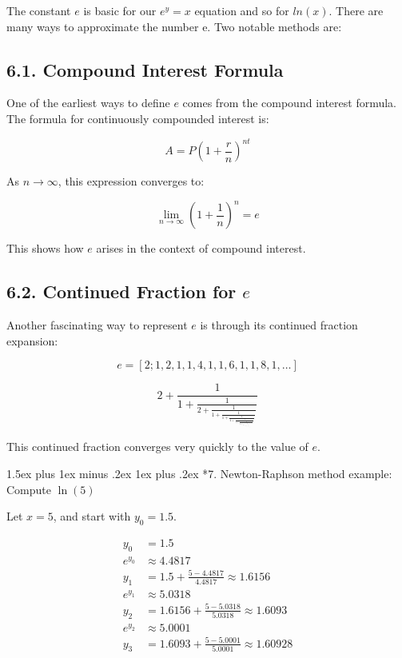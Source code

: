 \documentclass[10pt,twocolumn]{article}
\makeatletter
\renewcommand\section{%
  \@startsection{section}{1}{0pt}%
  {1.5ex plus 1ex minus .2ex}%
  {1ex plus .2ex}%
  {\normalfont\normalsize\bfseries}} %
\makeatother
\begin{document}
The constant \( e \) is basic for our \( e^y = x \) equation and so for \( ln(x) \). There are many ways to approximate the number e. Two notable methods are:

\subsection*{6.1. Compound Interest Formula}

One of the earliest ways to define \( e \) comes from the compound interest formula. The formula for continuously compounded interest is:

\[
A = P \left( 1 + \frac{r}{n} \right)^{nt}
\]

As \( n \to \infty \), this expression converges to:

\[
\lim_{n \to \infty} \left( 1 + \frac{1}{n} \right)^n = e
\]

This shows how \( e \) arises in the context of compound interest.

\subsection*{6.2. Continued Fraction for \( e \)}

Another fascinating way to represent \( e \) is through its continued fraction expansion:

\[
e = [2; 1, 2, 1, 1, 4, 1, 1, 6, 1, 1, 8, 1, \dots]
\]

\begin{equation}
2 + {\displaystyle \frac{1}{1 + \displaystyle \frac{1}{2 + \displaystyle \frac{1}{1 + \displaystyle \frac{1}{1 + \displaystyle \frac{1}{4 + \displaystyle \frac{1}{1 + \displaystyle \frac{1}{1 + \displaystyle \frac{1}{6 + \displaystyle \frac{1}{1 + \displaystyle \frac{1}{1 + \displaystyle \frac{1}{8}}}}}}}}}}}}
\end{equation}

This continued fraction converges very quickly to the value of \( e \).

\section*{7. Newton-Raphson method example: Compute \( \ln(5) \)}

Let \( x = 5 \), and start with \( y_0 = 1.5 \).

\begin{align*}
y_0 &= 1.5 \\
e^{y_0} &\approx 4.4817 \\
y_1 &= 1.5 + \frac{5 - 4.4817}{4.4817} \approx 1.6156 \\
e^{y_1} &\approx 5.0318 \\
y_2 &= 1.6156 + \frac{5 - 5.0318}{5.0318} \approx 1.6093 \\
e^{y_2} &\approx 5.0001 \\
y_3 &= 1.6093 + \frac{5 - 5.0001}{5.0001} \approx 1.60928
\end{align*}
\end{document}
